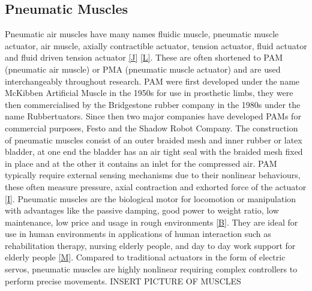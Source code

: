 \documentclass[11pt,a4paper]{article}
\begin{document}
\subsection{Pneumatic Muscles}
\label{sub:pneumatic_muscles}
Pneumatic air muscles have many names fluidic muscle, pneumatic muscle actuator, air muscle, axially contractible actuator, tension actuator, fluid actuator and fluid driven tension actuator \ref{J} \ref{L}. These are often shortened to PAM (pneumatic air muscle) or PMA (pneumatic muscle actuator) and are used interchangeably throughout research. PAM were first developed under the name McKibben Artificial Muscle in the 1950s for use in prosthetic limbs, they were then commercialised by the Bridgestone rubber company in the 1980s under the name Rubbertuators. Since then two major companies have developed PAMs for commercial purposes, Festo and the Shadow Robot Company. The construction of pneumatic muscles consist of an outer braided mesh and inner rubber or latex bladder, at one end the bladder has an air tight seal with the braided mesh fixed in place and at the other it contains an inlet for the compressed air. PAM typically require external sensing mechanisms due to their nonlinear behaviours, these often measure pressure, axial contraction and exhorted force of the actuator \ref{I}. \newline
Pneumatic muscles are the biological motor for locomotion or manipulation with advantages like the passive damping, good power to weight ratio, low maintenance, low price and usage in rough environments \ref{B}. They are ideal for use in human environments in applications of human interaction such as rehabilitation therapy, nursing elderly people, and day to day work support for elderly people \ref{M}. Compared to traditional actuators in the form of electric servos, pneumatic muscles are highly nonlinear requiring complex controllers to perform precise movements. \newline
INSERT PICTURE OF MUSCLES
\newline
\end{document}
